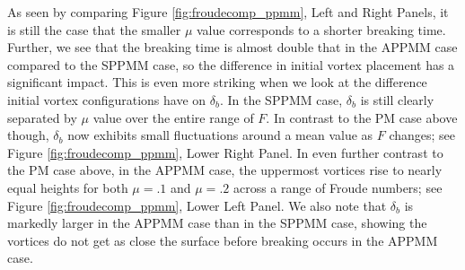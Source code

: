 \documentclass[a4paper,11pt]{article}
\begin{document}
As seen by comparing Figure \ref{fig:froudecomp_ppmm}, Left and Right Panels, it is still the case that the smaller $\mu$ value corresponds to a shorter breaking time.  Further, we see that the breaking time is almost double that in the APPMM case compared to the SPPMM case, so the difference in initial vortex placement has a significant impact.  This is even more striking when we look at the difference initial vortex configurations have on $\delta_{b}$.  In the SPPMM case, $\delta_{b}$ is still clearly separated by $\mu$ value over the entire range of $F$.  In contrast to the PM case above though, $\delta_{b}$ now exhibits small fluctuations around a mean value as $F$ changes; see Figure \ref{fig:froudecomp_ppmm}, Lower Right Panel.  In even further contrast to the PM case above, in the APPMM case, the uppermost vortices rise to nearly equal heights for both $\mu=.1$ and $\mu=.2$ across a range of Froude numbers; see Figure \ref{fig:froudecomp_ppmm}, Lower Left Panel.  We also note that $\delta_{b}$ is markedly larger in the APPMM case than in the SPPMM case, showing the vortices do not get as close the surface before breaking occurs in the APPMM case. 
%
\end{document}
